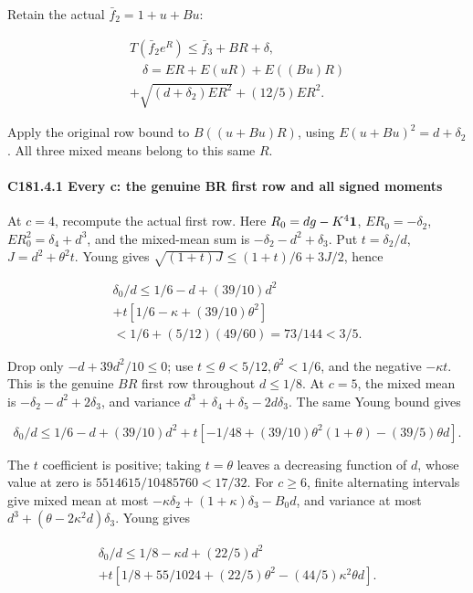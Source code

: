 Retain the actual \(\bar f_2=1+u+Bu\):

\[
\begin{gathered}
T(\bar f_2e^R)\le \bar f_3+BR+\delta,\\
\quad\delta=ER+E(uR)+E((Bu)R)\\
+\sqrt{(d+\delta_2)ER^2}+(12/5)ER^2.
\end{gathered}\tag{C181.T190.20}
\]

Apply the original row bound to \(B((u+Bu)R)\), using \(E(u+Bu)^2=d+\delta_2\). All three mixed means belong to this same \(R\).

\paragraph{C181.4.1 Every c: the genuine BR first row and all signed moments}

At \(c=4\), recompute the actual first row. Here \(R_0=dg-K^4\mathbf1\), \(ER_0=-\delta_2\), \(ER_0^2=\delta_4+d^3\), and the mixed-mean sum is \(-\delta_2-d^2+\delta_3\). Put \(t=\delta_2/d\), \(J=d^2+\theta^2t\). Young gives \(\sqrt{(1+t)J}\le(1+t)/6+3J/2\), hence

\[
\begin{gathered}
\delta_0/d\le1/6-d+(39/10)d^2\\
+t[1/6-\kappa+(39/10)\theta^2]\\
<1/6+(5/12)(49/60)=73/144<3/5.
\end{gathered}
\]

Drop only \(-d+39d^2/10\le0\); use \(t\le\theta<5/12,\allowbreak \allowbreak  \theta^2<1/6\), and the negative \(-\kappa t\). This is the genuine \(BR\) first row throughout \(d\le1/8\). At \(c=5\), the mixed mean is \(-\delta_2-d^2+2\delta_3\), and variance \(d^3+\delta_4+\delta_5-2d\delta_3\). The same Young bound gives

\[
 \delta_0/d\le1/6-d+(39/10)d^2
+t[-1/48+(39/10)\theta^2(1+\theta)-(39/5)\theta d].
\]

The \(t\) coefficient is positive; taking \(t=\theta\) leaves a decreasing function of \(d\), whose value at zero is \(5514615/10485760<17/32\). For \(c\ge6\), finite alternating intervals give mixed mean at most \(-\kappa \delta_2+(1+\kappa)\delta_3-B_0d\), and variance at most \(d^3+(\theta-2\kappa^2d)\delta_3\). Young gives

\[
\begin{gathered}
\delta_0/d\le1/8-\kappa d+(22/5)d^2\\
+t[1/8+55/1024+(22/5)\theta^2-(44/5)\kappa^2\theta d].
\end{gathered}
\]


